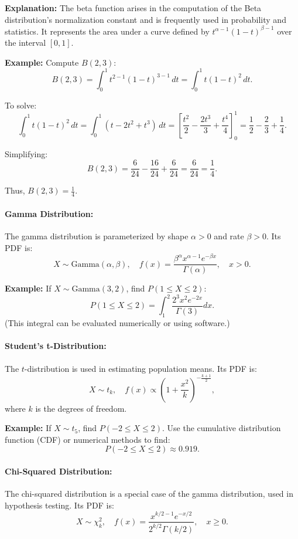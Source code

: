 \documentclass[12pt,a4paper]{article}
\begin{document}
\textbf{Explanation:} The beta function arises in the computation of the Beta distribution's normalization constant and is frequently used in probability and statistics. It represents the area under a curve defined by \( t^{\alpha - 1} (1 - t)^{\beta - 1} \) over the interval \([0, 1]\).

\textbf{Example:} Compute \( B(2, 3) \):
\[
B(2, 3) = \int_0^1 t^{2-1} (1 - t)^{3-1} \, dt = \int_0^1 t (1 - t)^2 \, dt.
\]

To solve:
\[
\int_0^1 t (1 - t)^2 \, dt = \int_0^1 (t - 2t^2 + t^3) \, dt = \left[ \frac{t^2}{2} - \frac{2t^3}{3} + \frac{t^4}{4} \right]_0^1 = \frac{1}{2} - \frac{2}{3} + \frac{1}{4}.
\]

Simplifying:
\[
B(2, 3) = \frac{6}{24} - \frac{16}{24} + \frac{6}{24} = \frac{6}{24} = \frac{1}{4}.
\]

Thus, \( B(2, 3) = \frac{1}{4} \).



\paragraph{Gamma Distribution:}
The gamma distribution is parameterized by shape \(\alpha > 0\) and rate \(\beta > 0\). Its PDF is:
\[
X \sim \text{Gamma}(\alpha, \beta), \quad f(x) = \frac{\beta^\alpha x^{\alpha-1} e^{-\beta x}}{\Gamma(\alpha)}, \quad x > 0.
\]

\textbf{Example:} If \(X \sim \text{Gamma}(3, 2)\), find \(P(1 \leq X \leq 2)\):
\[
P(1 \leq X \leq 2) = \int_{1}^{2} \frac{2^3 x^2 e^{-2x}}{\Gamma(3)} dx.
\]
(This integral can be evaluated numerically or using software.)

\paragraph{Student's t-Distribution:}
The \(t\)-distribution is used in estimating population means. Its PDF is:
\[
X \sim t_k, \quad f(x) \propto \left(1 + \frac{x^2}{k}\right)^{-\frac{k+1}{2}},
\]
where \(k\) is the degrees of freedom.

\textbf{Example:} If \(X \sim t_5\), find \(P(-2 \leq X \leq 2)\). Use the cumulative distribution function (CDF) or numerical methods to find:
\[
P(-2 \leq X \leq 2) \approx 0.919.
\]

\paragraph{Chi-Squared Distribution:}
The chi-squared distribution is a special case of the gamma distribution, used in hypothesis testing. Its PDF is:
\[
X \sim \chi_k^2, \quad f(x) = \frac{x^{k/2-1} e^{-x/2}}{2^{k/2} \Gamma(k/2)}, \quad x \geq 0.
\]
\end{document}
